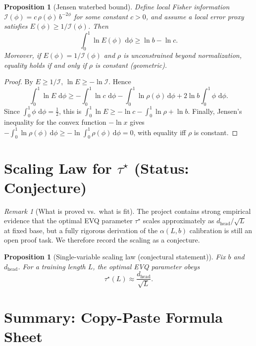 \documentclass[11pt]{article}
\theoremstyle{plain}
\newtheorem{proposition}[theorem]{Proposition}
\theoremstyle{definition}
\theoremstyle{remark}
\newtheorem{remark}[theorem]{Remark}
\newcommand{\dd}{\,\mathrm{d}}
\begin{document}
\begin{proposition}[Jensen waterbed bound]
Define local Fisher information $\mathcal{I}(\phi)=c\,\rho(\phi)\,b^{-2\phi}$ for
some constant $c>0$, and assume a local error proxy satisfies $E(\phi)\ge 1/\mathcal{I}(\phi)$.
Then
\begin{equation}
\int_0^1 \ln E(\phi)\,\dd\phi \ge \ln b-\ln c.
\label{eq:waterbed}
\end{equation}
Moreover, if $E(\phi)=1/\mathcal{I}(\phi)$ and $\rho$ is unconstrained beyond
normalization, equality holds if and only if $\rho$ is constant (geometric).
\end{proposition}
\begin{proof}
By $E\ge 1/\mathcal{I}$, $\ln E\ge -\ln \mathcal{I}$. Hence
\[
\int_0^1 \ln E\,\dd\phi \ge -\int_0^1 \ln c\,\dd\phi-\int_0^1\ln\rho(\phi)\dd\phi +2\ln b\int_0^1 \phi\,\dd\phi.
\]
Since $\int_0^1\phi\,\dd\phi=\tfrac{1}{2}$, this is
$\int_0^1\ln E\ge -\ln c-\int_0^1\ln\rho +\ln b$.
Finally, Jensen's inequality for the convex function $-\ln x$ gives
$-\int_0^1\ln\rho(\phi)\dd\phi \ge -\ln\!\int_0^1\rho(\phi)\dd\phi = 0$,
with equality iff $\rho$ is constant.
\end{proof}

\section{Scaling Law for \texorpdfstring{$\tau^\star$}{tau*} (Status: Conjecture)}

\begin{remark}[What is proved vs.\ what is fit]
The project contains strong empirical evidence that the optimal EVQ parameter
$\tau^\star$ scales approximately as $d_{\mathrm{head}}/\sqrt{L}$ at fixed base,
but a fully rigorous derivation of the $\alpha(L,b)$ calibration is still an
open proof task. We therefore record the scaling as a conjecture.
\end{remark}

\begin{proposition}[Single-variable scaling law (conjectural statement)]
Fix $b$ and $d_{\mathrm{head}}$. For a training length $L$, the optimal EVQ
parameter obeys
\begin{equation}
\tau^\star(L)\approx \frac{d_{\mathrm{head}}}{\sqrt{L}}.
\label{eq:tau_scaling_law}
\end{equation}
\end{proposition}

\section{Summary: Copy-Paste Formula Sheet}
\end{document}
